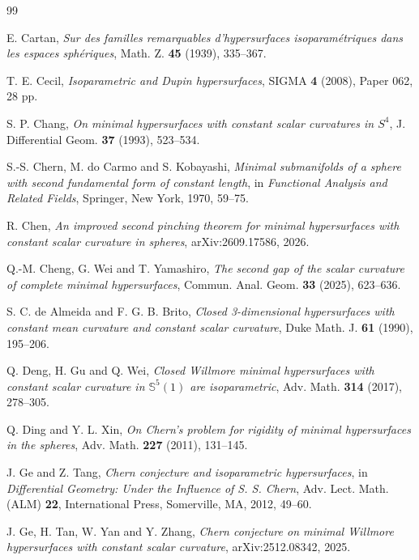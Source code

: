 \documentclass[11pt,reqno]{amsart}
\numberwithin{equation}{section}
\begin{document}
\raggedbottom
\begin{thebibliography}{99}

E. Cartan,
\emph{Sur des familles remarquables d'hypersurfaces isoparam\'etriques dans les espaces sph\'eriques},
Math. Z. \textbf{45} (1939), 335--367.

T. E. Cecil,
\emph{Isoparametric and Dupin hypersurfaces},
SIGMA \textbf{4} (2008), Paper 062, 28 pp.

S. P. Chang,
\emph{On minimal hypersurfaces with constant scalar curvatures in $S^4$},
J. Differential Geom. \textbf{37} (1993), 523--534.

S.-S. Chern, M. do Carmo and S. Kobayashi,
\emph{Minimal submanifolds of a sphere with second fundamental form of constant length},
in \emph{Functional Analysis and Related Fields}, Springer, New York, 1970, 59--75.

R. Chen,
\emph{An improved second pinching theorem for minimal hypersurfaces with constant scalar curvature in spheres},
arXiv:2609.17586, 2026.

Q.-M. Cheng, G. Wei and T. Yamashiro,
\emph{The second gap of the scalar curvature of complete minimal hypersurfaces},
Commun. Anal. Geom. \textbf{33} (2025), 623--636.

S. C. de Almeida and F. G. B. Brito,
\emph{Closed 3-dimensional hypersurfaces with constant mean curvature and constant scalar curvature},
Duke Math. J. \textbf{61} (1990), 195--206.

Q. Deng, H. Gu and Q. Wei,
\emph{Closed Willmore minimal hypersurfaces with constant scalar curvature in $\mathbb S^5(1)$ are isoparametric},
Adv. Math. \textbf{314} (2017), 278--305.

Q. Ding and Y. L. Xin,
\emph{On Chern's problem for rigidity of minimal hypersurfaces in the spheres},
Adv. Math. \textbf{227} (2011), 131--145.

J. Ge and Z. Tang,
\emph{Chern conjecture and isoparametric hypersurfaces},
in \emph{Differential Geometry: Under the Influence of S. S. Chern}, Adv. Lect. Math. (ALM) \textbf{22},
International Press, Somerville, MA, 2012, 49--60.

J. Ge, H. Tan, W. Yan and Y. Zhang,
\emph{Chern conjecture on minimal Willmore hypersurfaces with constant scalar curvature},
arXiv:2512.08342, 2025.


\end{thebibliography}
\end{document}
